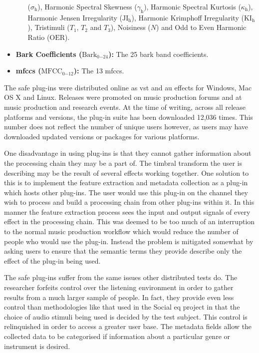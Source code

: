 \begin{itemize}
\begin{itemize}
				      ($\sigma_{\mathrm{h}}$), Harmonic Spectral Skewness ($\gamma_{\mathrm{h}}$), Harmonic
				      Spectral Kurtosis ($\kappa_{\mathrm{h}}$), Harmonic Jensen Irregularity
				      ($\mathrm{JI_{h}}$), Harmonic Krimphoff Irregularity
				      ($\mathrm{KI_{h}}$), Tristimuli ($T_{1}$, $T_{2}$ and $T_{3}$), Noisiness
				      ($N$) and Odd to Even Harmonic Ratio ($\mathrm{OER}$).
			\end{itemize}
			\item {\bf{Bark Coefficients (}}$\mathrm{Bark}_{0\mathrm{-}24}${\bf{):}} The 25 bark band
			      coefficients.
		      \item {\bf{\acrshort{mfccs} (}}$\mathrm{MFCC}_{0\mathrm{-}12}${\bf{):}} The 13 \acrshort{mfccs}.
		\end{itemize}

		The \acrshort{safe} plug-ins were distributed online as \acrshort{vst} and \acrshort{au} effects for
		Windows, Mac OS X and Linux.  Releases were promoted on music production forums and at music production and
		research events. At the time of writing, across all release platforms and versions, the plug-in suite has
		been downloaded 12,036 times. This number does not reflect the number of unique users however, as users may
		have downloaded updated versions or packages for various platforms.

		One disadvantage in using plug-ins is that they cannot gather information about the processing chain they
		may be a part of. The timbral transform the user is describing may be the result of several effects working
		together. One solution to this is to implement the feature extraction and metadata collection as a plug-in
		which hosts other plug-ins. The user would use this plug-in on the channel they wish to process and build a
		processing chain from other plug-ins within it. In this manner the feature extraction process sees the
		input and output signals of every effect in the processing chain. This was deemed to be too much of an
		interruption to the normal music production workflow which would reduce the number of people who would use
		the plug-in. Instead the problem is mitigated somewhat by asking users to ensure that the semantic terms
		they provide describe only the effect of the plug-in being used.

		The \acrshort{safe} plug-ins suffer from the same issues other distributed tests do. The researcher
		forfeits control over the listening environment in order to gather results from a much larger sample of
		people. In fact, they provide even less control than methodologies like that used in the Social
		\acrshort{eq} project \citep{cartwright2013socialeq} in that the choice of audio stimuli being used is
		decided by the test subject. This control is relinquished in order to access a greater user base. The
		metadata fields allow the collected data to be categorised if information about a particular genre or
		instrument is desired.

